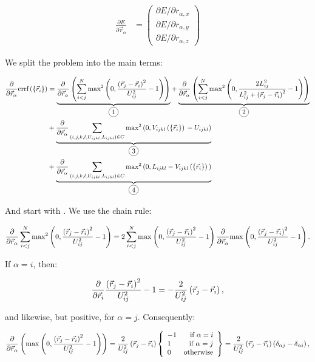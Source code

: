 \documentclass[a4paper]{article}
\newcommand*\circled[1]{
  \tikz[baseline=(char.base)]{
    \node[shape=circle,draw,inner sep=2pt] (char) {#1};
  }
}
\begin{document}
\begin{align*}
  \frac{\partial E}{\partial \vec{r}_\alpha} &= \begin{pmatrix}
    \partial E / \partial r_{\alpha , x} \\
    \partial E / \partial r_{\alpha , y} \\
    \partial E / \partial r_{\alpha , z} 
  \end{pmatrix}
\end{align*}

We split the problem into the main terms:

\begin{align*}
  \partialPosVec{\alpha} \errf 
  &= \underbrace{
    \partialPosVec{\alpha} \left(
      \ijNSum \distanceErrorFirstTerm{2}
    \right)
  }_{\circled{1}}
  + \underbrace{
    \partialPosVec{\alpha} \left(
      \ijNSum \distanceErrorSecondTerm{2}
    \right)
  }_{\circled{2}}\\
  &+ \underbrace{
    \partialPosVec{\alpha} \chiralSum \chiralErrorFirstTerm{2}
  }_{\circled{3}}\\
  &+ \underbrace{
    \partialPosVec{\alpha} \chiralSum \chiralErrorSecondTerm{2}
  }_{\circled{4}}
\end{align*}

\newpage
And start with \circled{1}. We use the chain rule:

\begin{equation}
  \frac{\partial}{\partial \vec{r}_{\alpha}} \sum_{i < j}^{N} \textrm{max}^{2} \left( 0, \frac{ \left( \vec{r}_{j} - \vec{r}_{i} \right)^{2} }{ U_{ij}^{2} } - 1 \right)
  = 2 \sum_{i < j}^{N} \textrm{max}^{} \left( 0, \frac{ \left( \vec{r}_{j} - \vec{r}_{i} \right)^{2} }{ U_{ij}^{2} } - 1 \right) \frac{\partial}{\partial \vec{r}_{\alpha}}
  \textrm{max}^{} \left( 0, \frac{ \left( \vec{r}_{j} - \vec{r}_{i} \right)^{2} }{ U_{ij}^{2} } - 1 \right).
\end{equation}

If $\alpha = i$, then:

\begin{equation}
  \frac{\partial}{\partial \vec{r}_{i}} \frac{ \left( \vec{r}_{j} - \vec{r}_{i} \right)^{2} }{ U_{ij}^{2} } - 1
  = - \frac{2}{U_{ij}^{2}} \left( \vec{r}_{j} - \vec{r}_{i} \right),
\end{equation}

and likewise, but positive, for $\alpha = j$. Consequently:

\begin{equation}
  \frac{\partial}{\partial \vec{r}_{\alpha}} \left( \textrm{max}^{} \left( 0, \frac{ \left( \vec{r}_{j} - \vec{r}_{i} \right)^{2} }{ U_{ij}^{2} } - 1 \right) \right)
  = \frac{2}{U_{ij}^{2}} \left( \vec{r}_{j} - \vec{r}_{i} \right) \left\{ \begin{array}{lr}
    -1 & \textrm{if }\alpha = i\\
    1 & \textrm{if }\alpha = j\\
    0 & \textrm{otherwise}
  \end{array} \right\}
  = \frac{2}{U_{ij}^{2}} \left( \vec{r}_{j} - \vec{r}_{i} \right) \left(
    \delta_{\alpha j} - \delta_{\alpha i} 
  \right),
\end{equation}
\end{document}
